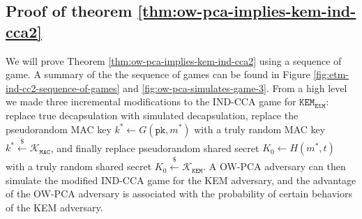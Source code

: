 \documentclass[journal=tches,submission]{iacrtrans}
\newcommand{\kem}{\texttt{KEM}}
\newcommand{\etm}{\texttt{EtM}}  %
\newcommand{\mac}{\texttt{MAC}}
\newcommand{\pk}{\texttt{pk}}
\newcommand{\leftsample}{\stackrel{\$}{\leftarrow}}
\begin{document}
\subsection{Proof of theorem \ref{thm:ow-pca-implies-kem-ind-cca2}}\label{sec:proof-of-theorem}
We will prove Theorem \ref{thm:ow-pca-implies-kem-ind-cca2} using a sequence of game. A summary of the the sequence of games can be found in Figure \ref{fig:etm-ind-cc2-sequence-of-games} and \ref{fig:ow-pca-simulates-game-3}. From a high level we made three incremental modifications to the IND-CCA game for $\kem_\etm$: replace true decapsulation with simulated decapsulation, replace the pseudorandom MAC key $k^\ast \leftarrow G(\pk, m^\ast)$ with a truly random MAC key $k^\ast \leftsample \mathcal{K}_\mac$, and finally replace pseudorandom shared secret $K_0 \leftarrow H(m^\ast, t)$ with a truly random shared secret $K_0 \leftsample \mathcal{K}_\kem$. A OW-PCA adversary can then simulate the modified IND-CCA game for the KEM adversary, and the advantage of the OW-PCA adversary is associated with the probability of certain behaviors of the KEM adversary.
\end{document}
